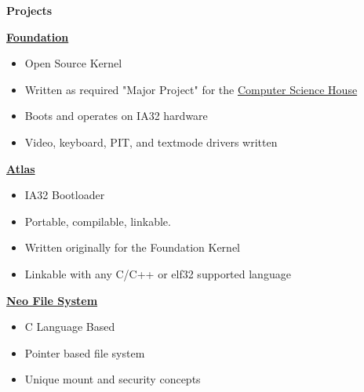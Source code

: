 \documentclass[letterpaper,11pt]{article}
\newcommand{\resitem}[1]{\item #1 \vspace{-2pt}}
\newcommand{\resheading}[1]{{\large \colorbox{mygrey}{\begin{minipage}{\textwidth}{\textbf{#1 \vphantom{p\^{E}}}}\end{minipage}}}}
\begin{document}
\resheading{Projects}
	\begin{itemize}
	{ \footnotesize 
		\resitem{\href{http://www.github.com/WillDignazio/Foundation/}{\textbf{Foundation}}
			\begin{itemize}
				\item{Open Source Kernel}}
				\item{Written as required "Major Project" for the {\href{http://csh.rit.edu/}{Computer Science House}}}
				\item{Boots and operates on IA32 hardware}
				\item{Video, keyboard, PIT, and textmode drivers written}
			\end{itemize}
		\resitem{\textbf{\href{http://www.github.com/WillDignazio/Atlas/}{Atlas}}}
			\begin{itemize}
				\item{IA32 Bootloader} 
				\item{Portable, compilable, linkable.} 
				\item{Written originally for the Foundation Kernel}
				\item{Linkable with any C/C++ or elf32 supported language}
			\end{itemize}
		\resitem{\textbf{\href{http://www.github.com/WillDignazio/Neo/}{\textbf{Neo File System}}}}									
		\begin{itemize}
			\item{C Language Based}
			\item{Pointer based file system}
			\item{Unique mount and security concepts}
			\end{itemize}
	}
	\end{itemize}

\end{document}
